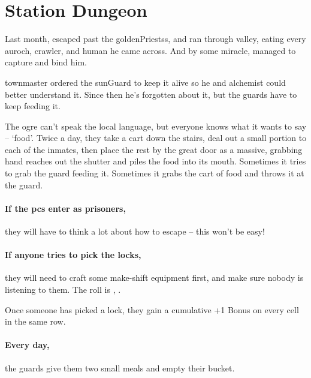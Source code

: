 \prisonMap

\section{Station Dungeon}
\label{stationDungeon}

\begin{multicols}{2}

\begin{exampletext}
  Last month,  escaped past the \glspl{goldenPriests}, and ran through \gls{valley}, eating every auroch, \gls{crawler}, and human he came across.
  And by some miracle,  managed to capture and bind him.

  \Gls{townmaster} ordered the \gls{sunGuard} to keep it alive so he and \gls{alchemist} could better understand it.
  Since then he's forgotten about it, but the guards have to keep feeding it.

  The \gls{ogre} can't speak the local language, but everyone knows what it wants to say -- `food'.
  Twice a day, they take a cart down the stairs, deal out a small portion to each of the inmates, then place the rest by the great door as a massive, grabbing hand reaches out the shutter and piles the food into its mouth.
  Sometimes it tries to grab the guard feeding it.
  Sometimes it grabs the cart of food and throws it at the guard.
\end{exampletext}

\paragraph{If the \glspl{pc} enter as prisoners,}
they will have to think a lot about how to escape -- this won't be easy!

\paragraph{If anyone tries to pick the locks,}
they will need to craft some make-shift equipment first, and make sure nobody is listening to them.
The roll is , \tn[12].

Once someone has picked a lock, they gain a cumulative +1 Bonus on every cell in the same row.

\paragraph{Every day,}
the guards give them two small meals and empty their bucket.


\end{multicols}
